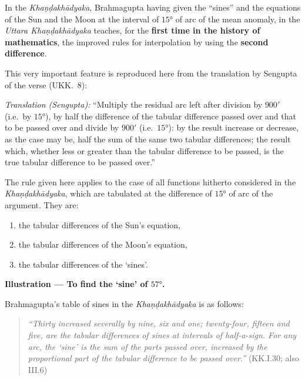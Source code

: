 \documentclass[11pt,a4paper]{article}
\newcommand{\bilingualverse}[3]{%
\noindent%
\begin{minipage}[t]{0.46\textwidth}
\vspace{0pt}
\begin{center}
\fcolorbox{rulecolor}{sanskritbg}{%
\parbox{0.95\textwidth}{%
\vspace{3pt}
\begin{center}
{\devanagarifont #1}
\end{center}
\vspace{2pt}
}}
\end{center}
\end{minipage}%
\hfill%
\begin{minipage}[t]{0.50\textwidth}
\vspace{0pt}
{\small #2}
\end{minipage}%
\vspace{4pt}
}
\begin{document}
In the \textit{Khaṇḍakhādyaka}, Brahmagupta having given the ``sines'' and the equations of the Sun and the Moon at the interval of $15°$ of arc of the mean anomaly, in the \textit{Uttara Khaṇḍakhādyaka} teaches, for the \textbf{first time in the history of mathematics}, the improved rules for interpolation by using the \textbf{second difference}.

This very important feature is reproduced here from the translation by Sengupta of the verse (UKK.\ 8):

\bilingualverse{%
अवशिष्टार्धजं शेषं विभक्तं नवशताङ्केन तत् |\\
तयोर्द्वयोरन्तरार्धेन गुणितं तद्विवर्धितं वा हीनं वा |\\
तयोर्युग्मस्यार्धं तत्स्यात्ततो युतं हीनं वा ||उ.खा. ८||
}{%
\textit{Translation (Sengupta):} ``Multiply the residual arc left after division by $900'$ (i.e.\ by $15°$), by half the difference of the tabular difference passed over and that to be passed over and divide by $900'$ (i.e.\ $15°$): by the result increase or decrease, as the case may be, half the sum of the same two tabular differences; the result which, whether less or greater than the tabular difference to be passed, is the true tabular difference to be passed over.''
}{U.Kh.\ 8}

The rule given here applies to the case of all functions hitherto considered in the \textit{Khaṇḍakhādyaka}, which are tabulated at the difference of $15°$ of arc of the argument. They are:
\begin{enumerate}[label=(\roman*)]
\item the tabular differences of the Sun's equation,
\item the tabular differences of the Moon's equation,
\item the tabular differences of the `sines'.
\end{enumerate}

\textbf{Illustration --- To find the `sine' of $57°$.}

Brahmagupta's table of sines in the \textit{Khaṇḍakhādyaka} is as follows:

\begin{quote}
\textit{``Thirty increased severally by nine, six and one; twenty-four, fifteen and five, are the tabular differences of sines at intervals of half-a-sign. For any arc, the `sine' is the sum of the parts passed over, increased by the proportional part of the tabular difference to be passed over.''} (KK.I.30; also III.6)
\end{quote}
\end{document}
